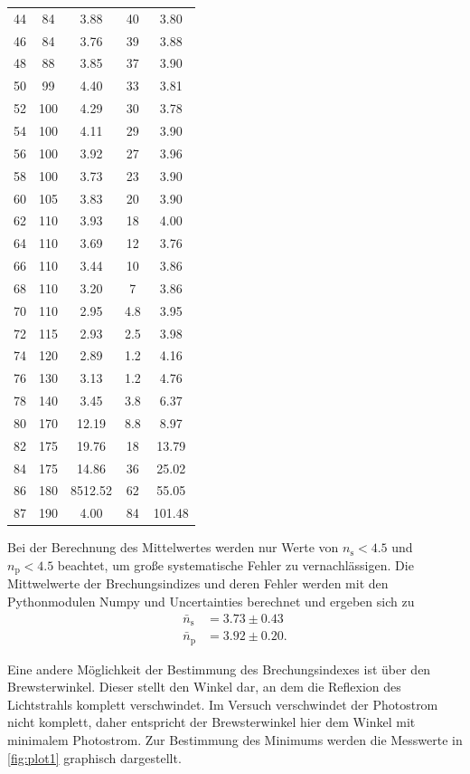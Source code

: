 \begin{table}[H]
\begin{tabular}{S[table-format=2.0] S S[table-format=4.2]S[table-format=2.1]S[table-format=3.2]}
    44 & 84  &  3.88    & 40 & 3.80 \\
    46 & 84  &  3.76    & 39 & 3.88 \\
    48 & 88  &  3.85    & 37 & 3.90 \\
    50 & 99  &  4.40    & 33 & 3.81 \\
    52 & 100 &  4.29    & 30 & 3.78\\
    54 & 100 &  4.11    & 29 & 3.90 \\
    56 & 100 &  3.92    & 27 & 3.96 \\
    58 & 100 &  3.73    & 23 & 3.90 \\
    60 & 105 &  3.83    & 20 & 3.90 \\
    62 & 110 &  3.93    & 18 & 4.00 \\
    64 & 110 &  3.69    & 12 & 3.76 \\
    66 & 110 &  3.44    & 10 & 3.86 \\
    68 & 110 &  3.20    &  7 & 3.86 \\
    70 & 110 &  2.95    &  4.8 & 3.95 \\
    72 & 115 &  2.93    &  2.5 & 3.98 \\
    74 & 120 &  2.89    &  1.2 & 4.16 \\
    76 & 130 &  3.13    &  1.2 & 4.76 \\
    78 & 140 &  3.45    &  3.8 & 6.37 \\
    80 & 170 &  12.19   &  8.8 & 8.97 \\
    82 & 175 &  19.76   & 18 & 13.79 \\
    84 & 175 &  14.86   & 36 & 25.02 \\
    86 & 180 &  8512.52 & 62 & 55.05 \\
    87 & 190 &  4.00    & 84 & 101.48 \\
   \bottomrule 
  \end{tabular}
\end{table}


Bei der Berechnung des Mittelwertes werden nur Werte von $n_{\text{s}}<4.5$ und $n_{\text{p}}<4.5$
beachtet, um große systematische Fehler zu vernachlässigen.
Die Mittwelwerte der Brechungsindizes und deren Fehler werden mit den Pythonmodulen Numpy \cite{numpy} und Uncertainties \cite{uncertainties} berechnet
und ergeben sich zu
\begin{align*}
  \bar{n}_{\text{s}}&=3.73 \pm 0.43 \\
  \bar{n}_{\text{p}}&=3.92 \pm 0.20.
\end{align*}

Eine andere Möglichkeit der Bestimmung des Brechungsindexes ist über den Brewsterwinkel.
Dieser stellt den Winkel dar, an dem die Reflexion des Lichtstrahls komplett verschwindet.
Im Versuch verschwindet der Photostrom nicht komplett, daher entspricht der Brewsterwinkel hier dem Winkel mit minimalem Photostrom.
Zur Bestimmung des Minimums werden die Messwerte in \autoref{fig:plot1} graphisch dargestellt.

